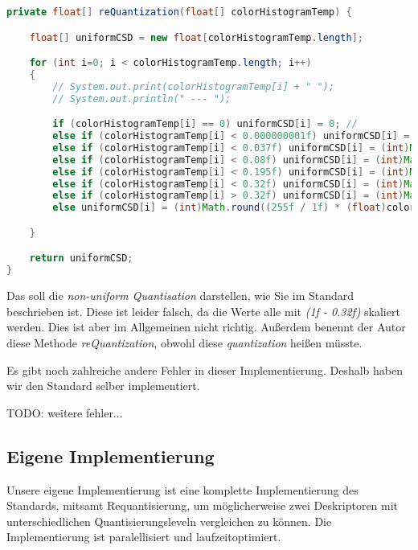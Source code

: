 \documentclass{article}
\begin{document}
    
    \begin{lstlisting}[language=Java]
private float[] reQuantization(float[] colorHistogramTemp) {

	float[] uniformCSD = new float[colorHistogramTemp.length];

	for (int i=0; i < colorHistogramTemp.length; i++)
	{
		// System.out.print(colorHistogramTemp[i] + " ");
		// System.out.println(" --- ");

		if (colorHistogramTemp[i] == 0) uniformCSD[i] = 0; //
		else if (colorHistogramTemp[i] < 0.000000001f) uniformCSD[i] = (int)Math.round( ( ((float)colorHistogramTemp[i] - 0.32f ) / ( 1f - 0.32f ) ) * 140 + (115 - 35 - 35 - 20 - 25 - 1) );	 // (int)Math.round((1f / 0.000000001f) * (float)colorHistogramTemp[i]);
		else if (colorHistogramTemp[i] < 0.037f) uniformCSD[i] = (int)Math.round( ( ((float)colorHistogramTemp[i] - 0.32f ) / ( 1f - 0.32f ) ) * 140 + (115 - 35 - 35 - 20 - 25));
		else if (colorHistogramTemp[i] < 0.08f) uniformCSD[i] = (int)Math.round( ( ((float)colorHistogramTemp[i] - 0.32f ) / ( 1f - 0.32f ) ) * 140 + (115 - 35 - 35 - 20));
		else if (colorHistogramTemp[i] < 0.195f) uniformCSD[i] = (int)Math.round( ( ((float)colorHistogramTemp[i] - 0.32f ) / ( 1f - 0.32f ) ) * 140 + (115 - 35 - 35));
		else if (colorHistogramTemp[i] < 0.32f) uniformCSD[i] = (int)Math.round( ( ((float)colorHistogramTemp[i] - 0.32f ) / ( 1f - 0.32f ) ) * 140 + (115 - 35));
		else if (colorHistogramTemp[i] > 0.32f) uniformCSD[i] = (int)Math.round( ( ((float)colorHistogramTemp[i] - 0.32f ) / ( 1f - 0.32f ) ) * 140 + 115);
		else uniformCSD[i] = (int)Math.round((255f / 1f) * (float)colorHistogramTemp[i]);

	}

	return uniformCSD;
}
	\end{lstlisting}
	Das soll die \emph{non-uniform Quantisation} darstellen, wie Sie im Standard beschrieben ist. Diese ist leider falsch, da die Werte alle mit \emph{(1f - 0.32f)} skaliert werden. Dies ist aber im Allgemeinen nicht richtig. Außerdem benennt der Autor diese Methode \emph{reQuantization}, obwohl diese \emph{quantization} heißen müsste.
	
	
	Es gibt noch zahlreiche andere Fehler in dieser Implementierung. Deshalb haben wir den Standard selber implementiert.
	
	
	TODO: weitere fehler...
    
  \subsection{Eigene Implementierung}
    Unsere eigene Implementierung ist eine komplette Implementierung des Standards, mitsamt Requantisierung, um möglicherweise zwei Deskriptoren mit unterschiedlichen Quantisierungsleveln vergleichen zu können. Die Implementierung ist paralellisiert und laufzeitoptimiert. 
    
\end{document}
